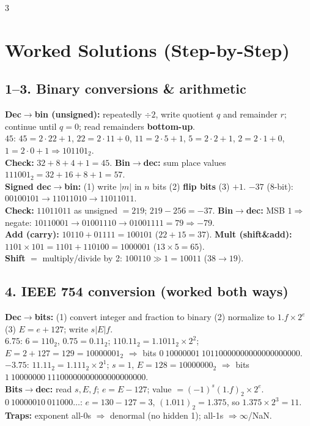 \documentclass[9pt]{extarticle}
\newcommand{\hl}[1]{\textbf{\textcolor{BrickRed}{#1}}}
\begin{document}
\begin{multicols}{3}
\section{Worked Solutions (Step-by-Step)}
\subsection{1--3. Binary conversions \& arithmetic}
\begin{sloppypar}\raggedright
\textbf{Dec$\to$bin (unsigned):} repeatedly $\div2$, write quotient $q$ and remainder $r$; continue until $q{=}0$; read remainders \hl{bottom-up}.\\
$45$: $45{=}2{\cdot}22{+}1$, $22{=}2{\cdot}11{+}0$, $11{=}2{\cdot}5{+}1$, $5{=}2{\cdot}2{+}1$, $2{=}2{\cdot}1{+}0$, $1{=}2{\cdot}0{+}1\Rightarrow101101_2$.\\
\hl{Check:} $32{+}8{+}4{+}1{=}45$. \textbf{Bin$\to$dec:} sum place values $111001_2{=}32{+}16{+}8{+}1{=}57$.\\
\textbf{Signed dec$\to$bin:} (1) write $|m|$ in $n$ bits (2) \hl{flip bits} (3) $+1$. $-37$ (8-bit): $00100101\to11011010\to11011011$.\\
\hl{Check:} $11011011$ as unsigned $=219$; $219{-}256{=}{-}37$. \textbf{Bin$\to$dec:} MSB $1\Rightarrow$ negate: $10110001\to01001110\to01001111{=}79\Rightarrow-79$.\\
\textbf{Add (carry):} $10110{+}01111{=}100101$ ($22{+}15{=}37$). \textbf{Mult (shift\&add):} $1101{\times}101{=}1101{+}110100{=}1000001$ ($13{\times}5{=}65$).\\
\textbf{Shift} $=$ multiply/divide by 2: $100110\gg1{=}10011$ ($38\to19$).
\end{sloppypar}

\subsection{4. IEEE 754 conversion (worked both ways)}
\begin{sloppypar}\raggedright
\textbf{Dec$\to$bits:} (1) convert integer and fraction to binary (2) normalize to $1.f\times2^e$ (3) $E{=}e{+}127$; write $s|E|f$.\\
$6.75$: $6{=}110_2$, $0.75{=}0.11_2$; $110.11_2{=}1.1011_2{\times}2^2$; $E{=}2{+}127{=}129{=}10000001_2$ $\Rightarrow$ bits $0\ 10000001\ 10110000000000000000000$.\\
$-3.75$: $11.11_2{=}1.111_2{\times}2^1$; $s{=}1$, $E{=}128{=}10000000_2$ $\Rightarrow$ bits $1\ 10000000\ 11100000000000000000000$.\\
\textbf{Bits$\to$dec:} read $s,E,f$; $e{=}E{-}127$; value $=(-1)^s(1.f)_2{\times}2^e$.\\
$0\ 10000010\ 011000\ldots$: $e{=}130{-}127{=}3$, $(1.011)_2{=}1.375$, so $1.375{\times}2^3{=}11$.\\
\hl{Traps:} exponent all-0s $\Rightarrow$ denormal (no hidden 1); all-1s $\Rightarrow\infty$/NaN.
\end{sloppypar}


\end{multicols}
\end{document}
